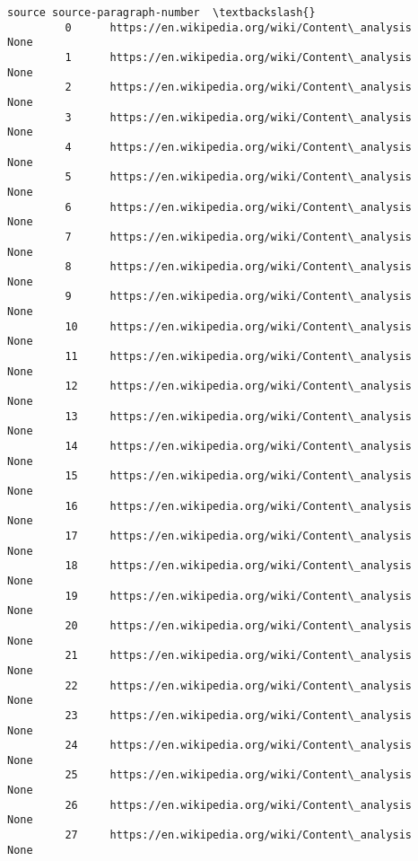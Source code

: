 \documentclass[11pt]{article}
\begin{document}
\begin{Verbatim}[commandchars=\\\{\}]
                                                        source source-paragraph-number  \textbackslash{}
         0      https://en.wikipedia.org/wiki/Content\_analysis                    None   
         1      https://en.wikipedia.org/wiki/Content\_analysis                    None   
         2      https://en.wikipedia.org/wiki/Content\_analysis                    None   
         3      https://en.wikipedia.org/wiki/Content\_analysis                    None   
         4      https://en.wikipedia.org/wiki/Content\_analysis                    None   
         5      https://en.wikipedia.org/wiki/Content\_analysis                    None   
         6      https://en.wikipedia.org/wiki/Content\_analysis                    None   
         7      https://en.wikipedia.org/wiki/Content\_analysis                    None   
         8      https://en.wikipedia.org/wiki/Content\_analysis                    None   
         9      https://en.wikipedia.org/wiki/Content\_analysis                    None   
         10     https://en.wikipedia.org/wiki/Content\_analysis                    None   
         11     https://en.wikipedia.org/wiki/Content\_analysis                    None   
         12     https://en.wikipedia.org/wiki/Content\_analysis                    None   
         13     https://en.wikipedia.org/wiki/Content\_analysis                    None   
         14     https://en.wikipedia.org/wiki/Content\_analysis                    None   
         15     https://en.wikipedia.org/wiki/Content\_analysis                    None   
         16     https://en.wikipedia.org/wiki/Content\_analysis                    None   
         17     https://en.wikipedia.org/wiki/Content\_analysis                    None   
         18     https://en.wikipedia.org/wiki/Content\_analysis                    None   
         19     https://en.wikipedia.org/wiki/Content\_analysis                    None   
         20     https://en.wikipedia.org/wiki/Content\_analysis                    None   
         21     https://en.wikipedia.org/wiki/Content\_analysis                    None   
         22     https://en.wikipedia.org/wiki/Content\_analysis                    None   
         23     https://en.wikipedia.org/wiki/Content\_analysis                    None   
         24     https://en.wikipedia.org/wiki/Content\_analysis                    None   
         25     https://en.wikipedia.org/wiki/Content\_analysis                    None   
         26     https://en.wikipedia.org/wiki/Content\_analysis                    None   
         27     https://en.wikipedia.org/wiki/Content\_analysis                    None   

\end{Verbatim}
\end{document}
